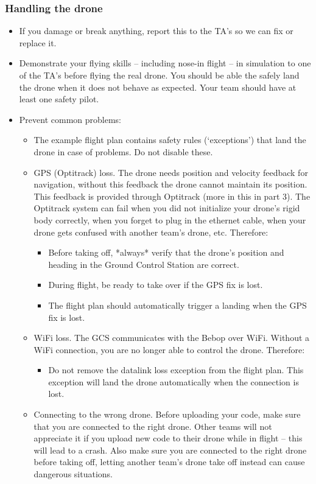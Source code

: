 \documentclass{article}
\begin{document}
\subsubsection*{Handling the drone}
\begin{itemize}
\item If you damage or break anything, report this to the TA's so we can fix or replace it.
\item Demonstrate your flying skills -- including nose-in flight -- in simulation to one of the TA's before flying the real drone. You should be able the safely land the drone when it does not behave as expected. Your team should have at least one safety pilot.
\item Prevent common problems:
\begin{itemize}
\item The example flight plan contains safety rules (`exceptions') that land the drone in case of problems. Do not disable these.
\item GPS (Optitrack) loss. The drone needs position and velocity feedback for navigation, without this feedback the drone cannot maintain its position. This feedback is provided through Optitrack (more in this in part 3). The Optitrack system can fail when you did not initialize your drone's rigid body correctly, when you forget to plug in the ethernet cable, when your drone gets confused with another team's drone, etc. Therefore:
\begin{itemize}
\item Before taking off, *always* verify that the drone's position and heading in the Ground Control Station are correct.
\item During flight, be ready to take over if the GPS fix is lost.
\item The flight plan should automatically trigger a landing when the GPS fix is lost.
\end{itemize}
\item WiFi loss. The GCS communicates with the Bebop over WiFi. Without a WiFi connection, you are no longer able to control the drone. Therefore:
\begin{itemize}
\item Do not remove the datalink loss exception from the flight plan. This exception will land the drone automatically when the connection is lost.
\end{itemize}
\item Connecting to the wrong drone. Before uploading your code, make sure that you are connected to the right drone. Other teams will not appreciate it if you upload new code to their drone while in flight -- this will lead to a crash. Also make sure you are connected to the right drone before taking off, letting another team's drone take off instead can cause dangerous situations.

\end{itemize}
\end{itemize}
\end{document}

